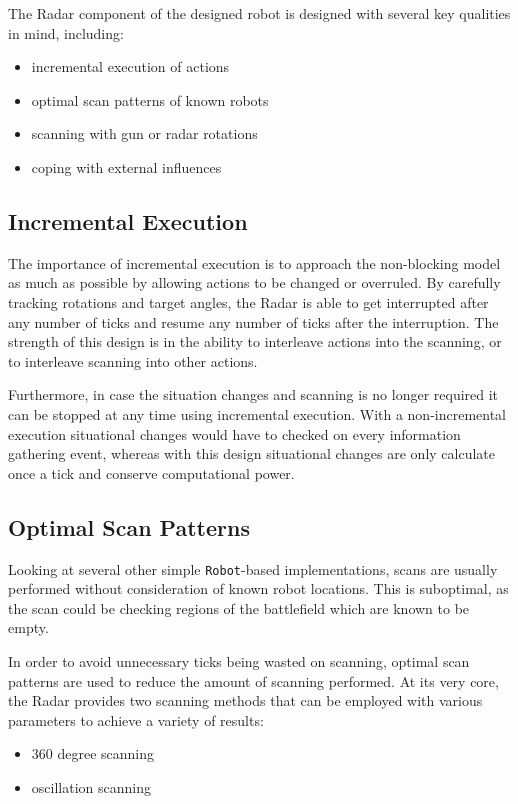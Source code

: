 \documentclass[11pt]{report}
\begin{document}
The Radar component of the designed robot is designed with several key qualities in mind, including:
\begin{itemize}
    \item incremental execution of actions %
    \item optimal scan patterns of known robots %
    \item scanning with gun or radar rotations %
    \item coping with external influences %
\end{itemize}

\subsection{Incremental Execution}
The importance of incremental execution is to approach the non-blocking model as much as possible by allowing actions to be changed or overruled. By carefully tracking rotations and target angles, the Radar is able to get interrupted after any number of ticks and resume any number of ticks after the interruption. The strength of this design is in the ability to interleave actions into the scanning, or to interleave scanning into other actions.

Furthermore, in case the situation changes and scanning is no longer required it can be stopped at any time using incremental execution. With a non-incremental execution situational changes would have to checked on every information gathering event, whereas with this design situational changes are only calculate once a tick and conserve computational power.

\subsection{Optimal Scan Patterns}
Looking at several other simple \texttt{Robot}-based implementations, scans are usually performed without consideration of known robot locations. This is suboptimal, as the scan could be checking regions of the battlefield which are known to be empty.

In order to avoid unnecessary ticks being wasted on scanning, optimal scan patterns are used to reduce the amount of scanning performed. At its very core, the Radar provides two scanning methods that can be employed with various parameters to achieve a variety of results:
\begin{itemize}
    \item 360 degree scanning
    \item oscillation scanning
\end{itemize}
\end{document}
